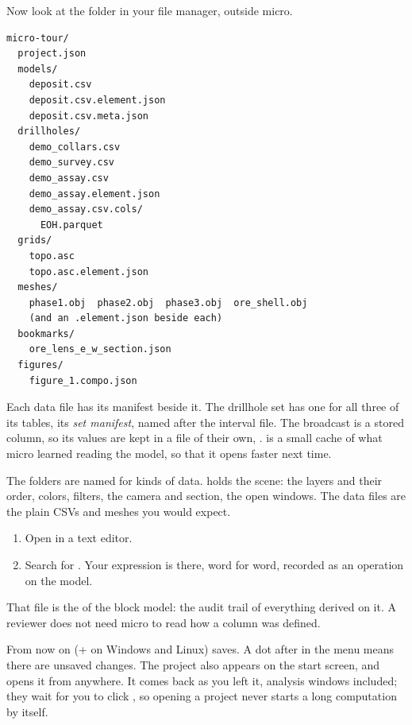 Now look at the folder in your file manager, outside micro.

\begin{lstlisting}
micro-tour/
  project.json
  models/
    deposit.csv
    deposit.csv.element.json
    deposit.csv.meta.json
  drillholes/
    demo_collars.csv
    demo_survey.csv
    demo_assay.csv
    demo_assay.element.json
    demo_assay.csv.cols/
      EOH.parquet
  grids/
    topo.asc
    topo.asc.element.json
  meshes/
    phase1.obj  phase2.obj  phase3.obj  ore_shell.obj
    (and an .element.json beside each)
  bookmarks/
    ore_lens_e_w_section.json
  figures/
    figure_1.compo.json
\end{lstlisting}

Each data file has its manifest beside it. The drillhole set has one for all three of its tables, its \emph{set manifest}, named after the interval file. The broadcast  is a stored column, so its values are kept in a file of their own, .  is a small cache of what micro learned reading the model, so that it opens faster next time.

The folders are named for kinds of data.  holds the scene: the layers and their order, colors, filters, the camera and section, the open windows. The data files are the plain CSVs and meshes you would expect.

\begin{tryit}
\begin{enumerate}
\item Open  in a text editor.
\item Search for . Your expression is there, word for word, recorded as an operation on the model.
\end{enumerate}
\end{tryit}

That file is the  of the block model: the audit trail of everything derived on it. A reviewer does not need micro to read how a column was defined.

From now on  (+ on Windows and Linux) saves. A dot after  in the  menu means there are unsaved changes. The project also appears on the start screen, and  opens it from anywhere. It comes back as you left it, analysis windows included; they wait for you to click , so opening a project never starts a long computation by itself.

